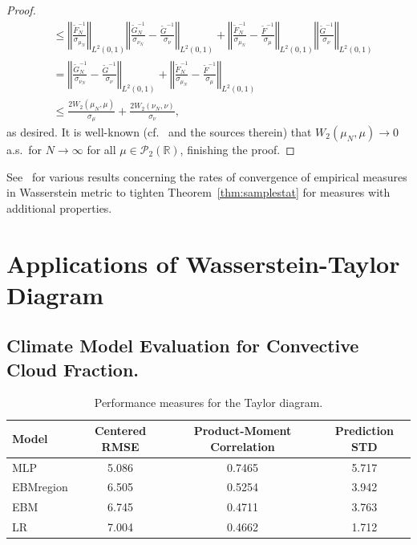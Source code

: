 \documentclass{amsart}
\numberwithin{equation}{section}
\theoremstyle{plain}
\theoremstyle{definition}
\newcommand{\norm}[1]{\left\Vert#1\right\Vert}
\newcommand{\rar}{\rightarrow}
\begin{document}
\begin{proof}
\begin{align*}
    &\leq \norm{\frac{\tilde{F}_N^{-1}}{\sigma_{\mu_N}}}_{L^2(0,1)}\norm{\frac{\tilde{G}_N^{-1}}{\sigma_{\nu_N}}-\frac{\tilde{G}^{-1}}{\sigma_{\nu}}}_{L^2(0,1)} + \norm{\frac{\tilde{F}_N^{-1}}{\sigma_{\mu_N}}-\frac{\tilde{F}^{-1}}{\sigma_{\mu}}}_{L^2(0,1)}\norm{\frac{\tilde{G}^{-1}}{\sigma_{\nu}}}_{L^2(0,1)}\\
    &=\norm{\frac{\tilde{G}_N^{-1}}{\sigma_{\nu_N}}-\frac{\tilde{G}^{-1}}{\sigma_{\nu}}}_{L^2(0,1)} + \norm{\frac{\tilde{F}_N^{-1}}{\sigma_{\mu_N}}-\frac{\tilde{F}^{-1}}{\sigma_{\mu}}}_{L^2(0,1)}\\
    &\leq \frac{2W_2(\mu_N,\mu)}{\sigma_\mu} + \frac{2W_2(\nu_N,\nu)}{\sigma_\nu},
\end{align*}
as desired.
It is well-known (cf.~\cite{bobkov2019one} and the sources therein) that $W_2(\mu_N,\mu) \rar 0$ a.s.\ for $N \rar \infty$ for all $\mu \in \mathcal{P}_2(\mathbb{R})$, finishing the proof.
\end{proof}
See~\cite{bobkov2019one} for various results concerning the rates of convergence of empirical measures in Wasserstein metric to tighten Theorem~\ref{thm:samplestat} for measures with additional properties. 



\section{Applications of Wasserstein-Taylor Diagram}\label{sec:application}

\subsection{Climate Model Evaluation for Convective Cloud Fraction.}\label{sec:climate}

\begin{table}
\centering
\caption{Performance measures for the Taylor diagram.}
\label{table:TaylorParametersClimate}

\begin{tabular}{lccc}
\toprule
Model & Centered RMSE & Product-Moment Correlation & Prediction STD \\
\midrule
MLP  & 5.086 & 0.7465 & 5.717 \\
EBMregion   & 6.505 & 0.5254  & 3.942 \\
EBM   & 6.745 & 0.4711 & 3.763 \\
LR   & 7.004 & 0.4662 & 1.712 \\
\hline
\end{tabular}
\end{table}
\end{document}
